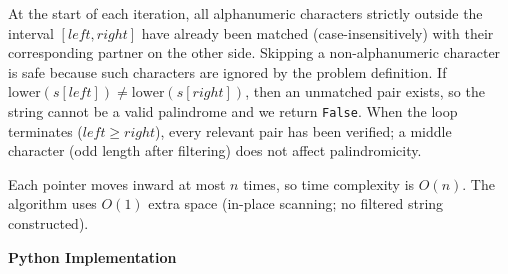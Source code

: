 \Correctness
At the start of each iteration, all alphanumeric characters strictly outside the interval $[left, right]$ have already been matched (case-insensitively) with their corresponding partner on the other side.
Skipping a non-alphanumeric character is safe because such characters are ignored by the problem definition.
If $\text{lower}(s[left]) \neq \text{lower}(s[right])$, then an unmatched pair exists, so the string cannot be a valid palindrome and we return \texttt{False}.
When the loop terminates ($left \ge right$), every relevant pair has been verified; a middle character (odd length after filtering) does not affect palindromicity.

\Complexity
Each pointer moves inward at most $n$ times, so time complexity is $O(n)$.
The algorithm uses $O(1)$ extra space (in-place scanning; no filtered string constructed).


%

\bigskip
\noindent\textbf{Python Implementation}



\ProblemDivider
